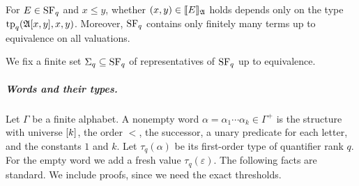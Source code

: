 \begin{lemma}\label{lemma: SF types}
  For $E \in \mathrm{SF}_{q}$ and $x \le y$, whether $(x, y) \in \llbracket E\rrbracket_{\mathfrak{A}}$ holds depends only on the type $\mathrm{tp}_{q}(\mathfrak{A}[x, y], x, y)$.
  Moreover, $\mathrm{SF}_{q}$ contains only finitely many terms up to equivalence on all valuations.
\end{lemma}

We fix a finite set $\Sigma_{q} \subseteq \mathrm{SF}_{q}$ of representatives of $\mathrm{SF}_{q}$ up to equivalence.

\subparagraph*{Words and their types.}
Let $\Gamma$ be a finite alphabet.
A nonempty word $\alpha = \alpha_1 \cdots \alpha_k \in \Gamma^{+}$ is the structure with universe $[k]$, the order $<$, the successor, a unary predicate for each letter, and the constants $1$ and $k$.
Let $\tau_q(\alpha)$ be its first-order type of quantifier rank $q$.
For the empty word we add a fresh value $\tau_q(\varepsilon)$.
The following facts are standard.
We include proofs, since we need the exact thresholds.

